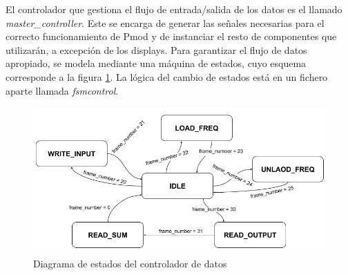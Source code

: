 El controlador que gestiona el flujo de entrada/salida de los datos es el llamado \emph{master\_controller}. Este se encarga de generar las señales necesarias para el correcto funcionamiento de Pmod y de instanciar el resto de componentes que utilizarán, a excepción de los displays. Para garantizar el flujo de datos apropiado, se modela mediante una máquina de estados, cuyo esquema corresponde a la figura \ref{fig:estados}. La lógica del cambio de estados está en un fichero aparte llamada \emph{fsm\-control}.

\begin{figure}[!th]
\begin{center}
\includegraphics[width=13cm]{img/destados.png}
\caption{\label{fig:estados}Diagrama de estados del controlador de datos}
\end{center}
\end{figure}

